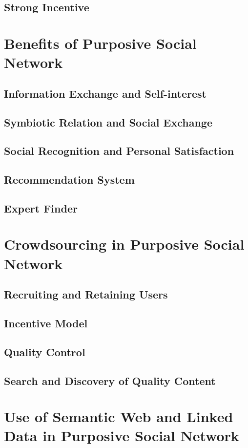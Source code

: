 \subsection{Strong Incentive}

\section{Benefits of Purposive Social Network}
\subsection{Information Exchange and Self-interest}
\subsection{Symbiotic Relation and Social Exchange}
\subsection{Social Recognition and Personal Satisfaction}
\subsection{Recommendation System}
\subsection{Expert Finder}

\section{Crowdsourcing in Purposive Social Network}
\subsection{Recruiting and Retaining Users}
\subsection{Incentive Model}
\subsection{Quality Control}
\subsection{Search and Discovery of Quality Content}

\section{Use of Semantic Web and Linked Data in Purposive Social Network}
